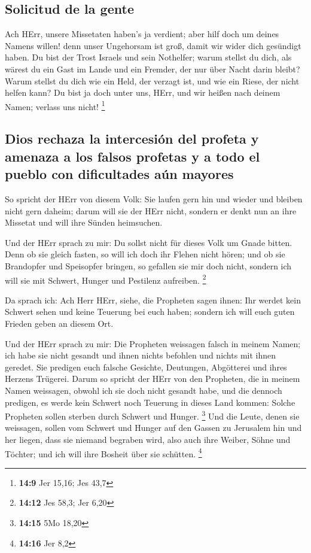 \hypertarget{solicitud-de-la-gente}{%
\subsection{Solicitud de la gente}\label{solicitud-de-la-gente}}

 Ach HErr, unsere Missetaten haben's ja verdient; aber
hilf doch um deines Namens willen! denn unser Ungehorsam ist groß, damit
wir wider dich gesündigt haben.  Du bist der Trost Israels
und sein Nothelfer; warum stellst du dich, als wärest du ein Gast im
Lande und ein Fremder, der nur über Nacht darin bleibt? 
Warum stellst du dich wie ein Held, der verzagt ist, und wie ein Riese,
der nicht helfen kann? Du bist ja doch unter uns, HErr, und wir heißen
nach deinem Namen; verlass uns nicht! \footnote{\textbf{14:9} Jer 15,16;
  Jes 43,7}

\hypertarget{dios-rechaza-la-intercesiuxf3n-del-profeta-y-amenaza-a-los-falsos-profetas-y-a-todo-el-pueblo-con-dificultades-auxfan-mayores}{%
\subsection{Dios rechaza la intercesión del profeta y amenaza a los
falsos profetas y a todo el pueblo con dificultades aún
mayores}\label{dios-rechaza-la-intercesiuxf3n-del-profeta-y-amenaza-a-los-falsos-profetas-y-a-todo-el-pueblo-con-dificultades-auxfan-mayores}}

 So spricht der HErr von diesem Volk: Sie laufen gern hin
und wieder und bleiben nicht gern daheim; darum will sie der HErr nicht,
sondern er denkt nun an ihre Missetat und will ihre Sünden heimsuchen.

 Und der HErr sprach zu mir: Du sollst nicht für dieses
Volk um Gnade bitten.  Denn ob sie gleich fasten, so will
ich doch ihr Flehen nicht hören; und ob sie Brandopfer und Speisopfer
bringen, so gefallen sie mir doch nicht, sondern ich will sie mit
Schwert, Hunger und Pestilenz aufreiben. \footnote{\textbf{14:12} Jes
  58,3; Jer 6,20}

 Da sprach ich: Ach Herr HErr, siehe, die Propheten sagen
ihnen: Ihr werdet kein Schwert sehen und keine Teuerung bei euch haben;
sondern ich will euch guten Frieden geben an diesem Ort.

 Und der HErr sprach zu mir: Die Propheten weissagen
falsch in meinem Namen; ich habe sie nicht gesandt und ihnen nichts
befohlen und nichts mit ihnen geredet. Sie predigen euch falsche
Gesichte, Deutungen, Abgötterei und ihres Herzens Trügerei.
 Darum so spricht der HErr von den Propheten, die in
meinem Namen weissagen, obwohl ich sie doch nicht gesandt habe, und die
dennoch predigen, es werde kein Schwert noch Teuerung in dieses Land
kommen: Solche Propheten sollen sterben durch Schwert und Hunger.
\footnote{\textbf{14:15} 5Mo 18,20}  Und die Leute, denen
sie weissagen, sollen vom Schwert und Hunger auf den Gassen zu Jerusalem
hin und her liegen, dass sie niemand begraben wird, also auch ihre
Weiber, Söhne und Töchter; und ich will ihre Bosheit über sie schütten.
\footnote{\textbf{14:16} Jer 8,2}

